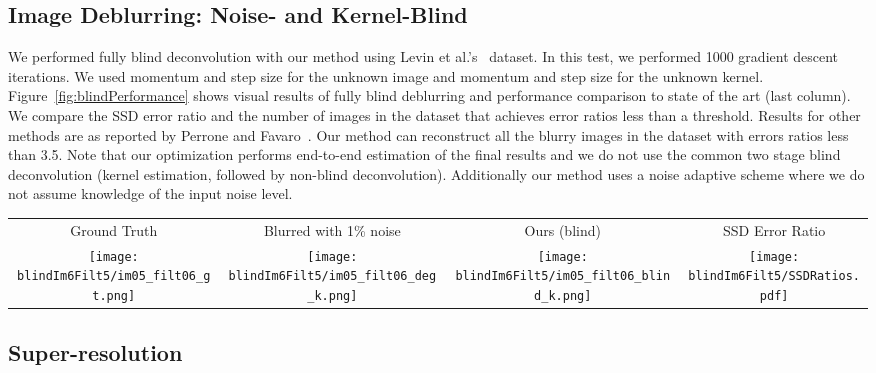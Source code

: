\documentclass{article}
\begin{document}
\subsection{Image Deblurring: Noise- and Kernel-Blind}
We performed fully blind deconvolution with our method using Levin et al.'s~\cite{levin2007image} dataset.
In this test, we performed 1000 gradient descent iterations.
We used momentum  and step size  for the unknown image and momentum  and step size  for the unknown kernel.
Figure~\ref{fig:blindPerformance} shows visual results of fully blind deblurring and performance comparison to state of the art (last column).
We compare the SSD error ratio and the number of images in the dataset that achieves error ratios less than a threshold.
Results for other methods are as reported by Perrone and Favaro~\cite{perrone2016logarithmic}.
Our method can reconstruct all the blurry images in the dataset with errors ratios less than 3.5.
Note that our optimization performs end-to-end estimation of the final results and we do not use the common two stage blind deconvolution (kernel estimation, followed by non-blind deconvolution).
Additionally our method uses a noise adaptive scheme where we do not assume knowledge of the input noise level.

\begin{figure*}[t]
\centering
\bgroup
\setlength{\tabcolsep}{2pt}
\begin{tabular}{cccc}
Ground Truth & Blurred with 1\% noise & Ours (blind) & SSD Error Ratio \\
\texttt{[image: blindIm6Filt5/im05\_filt06\_gt.png]} &
\texttt{[image: blindIm6Filt5/im05\_filt06\_deg\_k.png]} &
\texttt{[image: blindIm6Filt5/im05\_filt06\_blind\_k.png]} &
\texttt{[image: blindIm6Filt5/SSDRatios.pdf]} 
\end{tabular}
\egroup
\caption{
Performance of our method for fully (noise- and kernel-) blind deblurring on Levin's set.
}
\label{fig:blindPerformance}
\end{figure*}


\subsection{Super-resolution}
\end{document}
